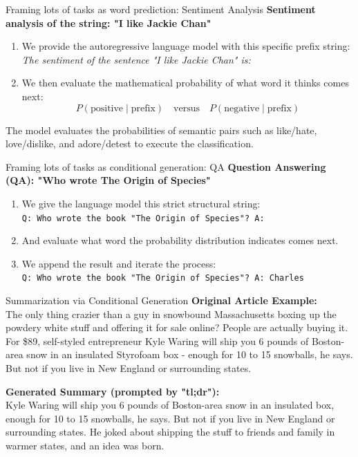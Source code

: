 \documentclass[aspectratio=169]{beamer}
\begin{document}
\begin{frame}{Framing lots of tasks as word prediction: Sentiment Analysis}\justifying
    \textbf{Sentiment analysis of the string: "I like Jackie Chan"}
    
    \begin{enumerate}
        \item We provide the autoregressive language model with this specific prefix string: \\
        \textit{The sentiment of the sentence "I like Jackie Chan" is:}
        \item We then evaluate the mathematical probability of what word it thinks comes next: \\
        \[ P(\text{positive} \mid \text{prefix}) \quad \text{versus} \quad P(\text{negative} \mid \text{prefix}) \]
    \end{enumerate}
    The model evaluates the probabilities of semantic pairs such as like/hate, love/dislike, and adore/detest to execute the classification.
\end{frame}

\begin{frame}{Framing lots of tasks as conditional generation: QA}\justifying
    \textbf{Question Answering (QA): "Who wrote The Origin of Species"}
    
    \begin{enumerate}
        \item We give the language model this strict structural string: \\
        \texttt{Q: Who wrote the book "The Origin of Species"? A:}
        \item And evaluate what word the probability distribution indicates comes next.
        \item We append the result and iterate the process: \\
        \texttt{Q: Who wrote the book "The Origin of Species"? A: Charles}
    \end{enumerate}
\end{frame}

\begin{frame}{Summarization via Conditional Generation}\justifying
    \textbf{Original Article Example:} \\
    The only thing crazier than a guy in snowbound Massachusetts boxing up the powdery white stuff and offering it for sale online? People are actually buying it. For \$89, self-styled entrepreneur Kyle Waring will ship you 6 pounds of Boston-area snow in an insulated Styrofoam box - enough for 10 to 15 snowballs, he says. But not if you live in New England or surrounding states.
    
    \vspace{0.5cm}
    \textbf{Generated Summary (prompted by "tl;dr"):} \\
    Kyle Waring will ship you 6 pounds of Boston-area snow in an insulated box, enough for 10 to 15 snowballs, he says. But not if you live in New England or surrounding states. He joked about shipping the stuff to friends and family in warmer states, and an idea was born.
\end{frame}
\end{document}

